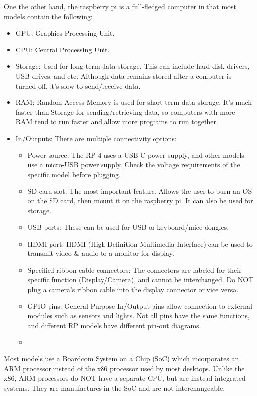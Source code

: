 \documentclass[a4paper, 10pt]{article}
\begin{document}
    One the other hand, the raspberry pi is a full-fledged computer in that most models contain the following:
    \begin{itemize}
      \item GPU: Graphics Processing Unit. 
      \item CPU: Central Processing Unit.
      \item Storage: Used for long-term data storage. This can include hard disk drivers, USB drives, and etc. Although data remains stored after a computer is turned off, it's slow to send/receive data.
      \item RAM: Random Access Memory is used for short-term data storage. It's much faster than Storage for sending/retrieving data, so computers with more RAM tend to run faster and allow more programs to run together.
      \item In/Outputs: There are multiple connectivity options:
        \begin{itemize}
          \item Power source: The RP 4 uses a USB-C power supply, and other models use a micro-USB power supply. Check the voltage requirements of the specific model before plugging. 
          \item SD card slot: The most important feature. Allows the user to burn an OS on the SD card, then mount it on the raspberry pi. It can also be used for storage.
          \item USB ports: These can be used for USB or keyboard/mice dongles.
          \item HDMI port: HDMI (High-Definition Multimedia Interface) can be used to transmit video & audio to a monitor for display.
          \item Specified ribbon cable connectors: The connectors are labeled for their specific function (Display/Camera), and cannot be interchanged. Do NOT plug a camera's ribbon cable into the display connector or vice versa. 
          \item GPIO pins: General-Purpose In/Output pins allow connection to external modules such as sensors and lights. Not all pins have the same functions, and different RP models have different pin-out diagrams.
          \item 
        \end{itemize}
    \end{itemize}

    Most models use a Boardcom System on a Chip (SoC) which incorporates an ARM processor instead of the x86 processor used by most desktops. 
    Unlike the x86, ARM processors do NOT have a separate CPU, but are instead integrated systems. They are manufactures in the SoC and are not interchangeable.  \\
\end{document}
